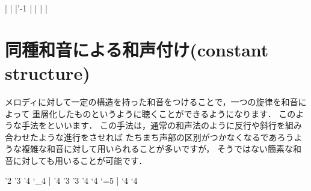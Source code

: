 \documentclass[dvipdfmx,uplatex,b5paper,openany,jbase=12Q,nomag*,textwidth-limit=44%
               ]{gachimuchi}[2020/05/05]
\begin{document}
\begin{Music}
  \Startpiece%
  \NOtes
  \sk%
  |%
  \en\bar
  \NOtes
  |\rq{-1}%
  \en\bar
  \NOtes
  |%
  \en\bar
  \NOtes
  \sk
  |%
  \en\setdoublebar
  \endpiece%
\end{Music}

\section{同種和音による和声付け(constant structure)}
メロディに対して一定の構造を持った和音をつけることで，一つの旋律を和音によって
重層化したものというように聴くことができるようになります．
このような手法をといいます．
この手法は，通常の和声法のように反行や斜行を組み合わせたような進行をさせれば
たちまち声部の区別がつかなくなるであろうような複雑な和音に対して用いられることが多いですが，
そうではない簡素な和音に対しても用いることが可能です．

\begin{Music}
  \nostartrule%
  \generalmeter{\meterC}%
  \Startpiece%
  \NOtes{}%
  \rq{2}%
  \rq{3}%
  \rq{4}%
  \lq{_4}%
  \en\bar
  \NOtes
  \rq{4}%
  \rq{3}%
  \en\NOTes
  \en\doublebar
  \NOtes{}%
  \rq{3}%
  \rq{4}%
  \lq{4}%
  \lq{=5}%
  \en\bar
  \NOtes
  \lq{4}%
  \lq{4}%
  \en\NOTes
  \en\setdoublebar
  \endpiece%
\end{Music}
\end{document}
